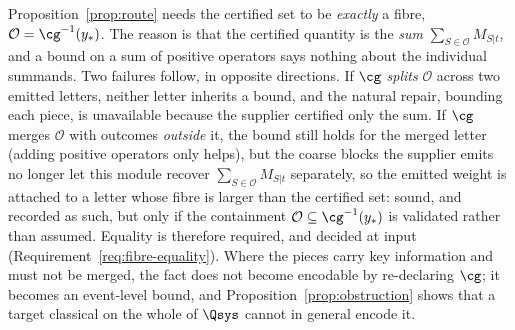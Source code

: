 
\begin{remark}\label{rem:fibre}
Proposition~\ref{prop:route} needs the certified set to be \emph{exactly} a
fibre, $\mathcal{O}=\cg^{-1}(y_{*})$. The reason is that the certified quantity
is the \emph{sum} $\sum_{S\in\mathcal{O}}M_{S|t}$, and a bound on a sum of
positive operators says nothing about the individual summands. Two failures
follow, in opposite directions. If $\cg$ \emph{splits} $\mathcal{O}$ across two
emitted letters, neither letter inherits a bound, and the natural repair,
bounding each piece, is unavailable because the supplier certified only the
sum. If $\cg$ merges $\mathcal{O}$ with outcomes \emph{outside} it, the bound
still holds for the merged letter (adding positive operators only helps), but
the coarse blocks the supplier emits no longer let this module recover
$\sum_{S\in\mathcal{O}}M_{S|t}$ separately, so the emitted weight is attached
to a letter whose fibre is larger than the certified set: sound, and
recorded as such, but only if the containment
$\mathcal{O}\subseteq\cg^{-1}(y_{*})$ is validated rather than assumed.
Equality is therefore required, and decided at input
(Requirement~\ref{req:fibre-equality}). Where the pieces carry key
information and must not be merged, the fact does not become encodable by
re-declaring $\cg$; it becomes an event-level bound, and
Proposition~\ref{prop:obstruction} shows that a target classical on the
whole of $\Qsys$ cannot in general encode it.
\end{remark}
